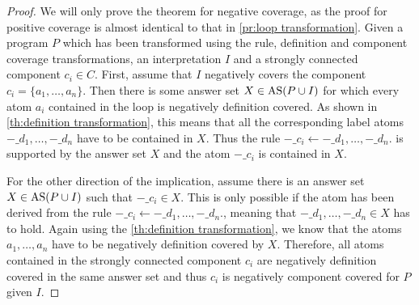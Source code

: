 \begin{proof}
\label{pr:component transformation}
    We will only prove the theorem for negative coverage, as the proof for positive coverage is almost identical to that in \cref{pr:loop transformation}. Given a program $P$ which has been transformed using the rule, definition and component coverage transformations, an interpretation $I$ and a strongly connected component $c_i \in C$. First, assume that $I$ negatively covers the component \(c_i = \{a_1, \ldots, a_n\}\). Then there is some answer set \(X \in \operatorname{AS}(P \cup I)\) for which every atom $a_i$ contained in the loop is negatively definition covered. As shown in \cref{th:definition transformation}, this means that all the corresponding label atoms \(-\_d_1, \ldots, -\_d_n\) have to be contained in $X$. Thus the rule \(-\_c_i \leftarrow -\_d_1, \ldots, -\_d_n.\) is supported by the answer set $X$ and the atom $-\_c_i$ is contained in $X$. 

    For the other direction of the implication, assume there is an answer set \(X \in \operatorname{AS}(P \cup I)\) such that \(-\_c_i \in X\). This is only possible if the atom has been derived from the rule \(-\_c_i \leftarrow -\_d_1, \ldots, -\_d_n.\), meaning that \(-\_d_1, \ldots, -\_d_n \in X\) has to hold. Again using the \cref{th:definition transformation}, we know that the atoms \(a_1, \ldots, a_n\) have to be negatively definition covered by $X$. Therefore, all atoms contained in the strongly connected component $c_i$ are negatively definition covered in the same answer set and thus $c_i$ is negatively component covered for $P$ given $I$.
\end{proof}

